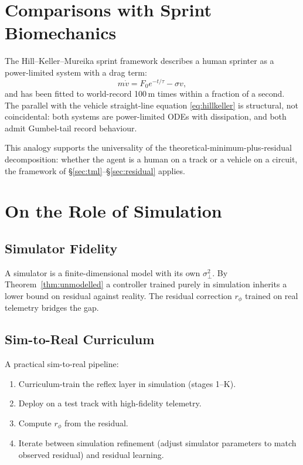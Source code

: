\documentclass[11pt,twocolumn]{article}
\theoremstyle{definition}
\theoremstyle{remark}
\begin{document}
\section{Comparisons with Sprint Biomechanics}
\label{app:biomech}

The Hill--Keller--Mureika sprint framework \cite{hill1925muscular,keller1973theory,mureika2001phenomenological} describes a human sprinter as a power-limited system with a drag term:
\begin{equation}
m \dot v = F_0 e^{-t/\tau} - \sigma v,
\end{equation}
and has been fitted to world-record 100\,m times within a fraction of a second. The parallel with the vehicle straight-line equation \eqref{eq:hillkeller} is structural, not coincidental: both systems are power-limited ODEs with dissipation, and both admit Gumbel-tail record behaviour.

This analogy supports the universality of the theoretical-minimum-plus-residual decomposition: whether the agent is a human on a track or a vehicle on a circuit, the framework of \S\ref{sec:tml}--\S\ref{sec:residual} applies.

\section{On the Role of Simulation}
\label{app:simulation}

\subsection{Simulator Fidelity}

A simulator is a finite-dimensional model with its own $\sigma^2_{\perp}$. By Theorem~\ref{thm:unmodelled} a controller trained purely in simulation inherits a lower bound on residual against reality. The residual correction $r_\phi$ trained on real telemetry bridges the gap.

\subsection{Sim-to-Real Curriculum}

A practical sim-to-real pipeline:
\begin{enumerate}[leftmargin=*,itemsep=2pt]
\item Curriculum-train the reflex layer in simulation (stages 1--K).
\item Deploy on a test track with high-fidelity telemetry.
\item Compute $r_\phi$ from the residual.
\item Iterate between simulation refinement (adjust simulator parameters to match observed residual) and residual learning.
\end{enumerate}
\end{document}
